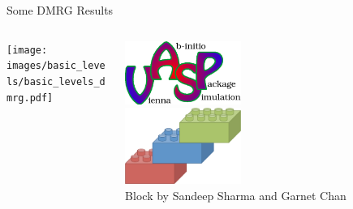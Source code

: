 
\begin{frame}{Some DMRG\: Results} %
  \begin{columns}
    \begin{column}{0.5\textwidth}
      \texttt{[image: images/basic\_levels/basic\_levels\_dmrg.pdf]}
    \end{column}
    \begin{column}{0.5\textwidth}
      \begin{center}
        \includegraphics[width=0.4\textwidth]{images/vasp_logo.eps}\\
        \vspace{1cm}
        \includegraphics[width=0.4\textwidth]{images/dmrg_logo.jpg}\\
        {
          Block by Sandeep Sharma and Garnet Chan
        }
      \end{center}
    \end{column}
  \end{columns}
\end{frame}



